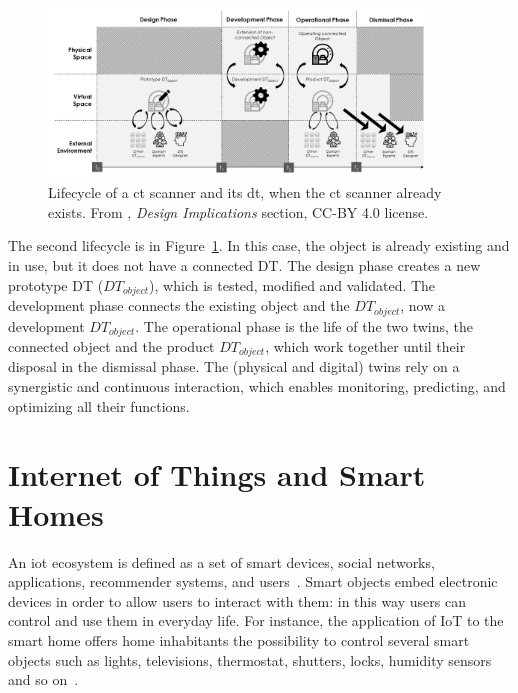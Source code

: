 \begin{figure}
    \centering
    \includegraphics[width=0.9\textwidth]{images/dt_lifecycle_2.png}
    \caption[Lifecycle of a \acrshort{ct} scanner and its \acrshort{dt}, when the \acrshort{ct} scanner already exists]{Lifecycle of a \acrshort{ct} scanner and its \acrshort{dt}, when the \acrshort{ct} scanner already exists. From \cite{barricelliSurveyDigitalTwin2019}, \textit{Design Implications} section, CC-BY 4.0 license.}
    \label{fig:dt_lifecycle_2}
\end{figure}

The second lifecycle is in Figure~\ref{fig:dt_lifecycle_2}. In this case, the object is already existing and in use, but it does not have a connected DT. The design phase creates a new prototype DT ($DT_{object}$), which is tested, modified and validated. The development phase connects the existing object and the $DT_{object}$, now a development $DT_{object}$. The operational phase is the life of the two twins, the connected object and the product $DT_{object}$, which work together until their disposal in the dismissal phase. The (physical and digital) twins rely on a synergistic and continuous interaction, which enables monitoring, predicting, and optimizing all their functions.

\section{Internet of Things and Smart Homes}

An \acrfull{iot} ecosystem is defined as a set of smart devices, social networks, applications, recommender systems, and users~\parencite{barricelliDesigningEndUserDevelopment2015}. Smart objects embed electronic devices in order to allow users to interact with them: in this way users can control and use them in everyday life. For instance, the application of IoT to the smart home offers home inhabitants the possibility to control several smart objects such as lights, televisions, thermostat, shutters, locks, humidity sensors and so on~\parencite{kortuemSmartObjectsBuilding2010,wuRespectChangeUser2017}.

